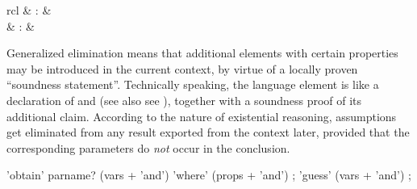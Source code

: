 \begin{isabellebody}
{}
\isamarkuptrue%
%
\begin{isamarkuptext}%
\begin{matharray}{rcl}
    \hypertarget{command.obtain}{\hyperlink{command.obtain}{\mbox{}}} & : &  \\
    \hypertarget{command.guess}{\hyperlink{command.guess}{\mbox{}}}\isa{{\isachardoublequote}\isactrlsup {\isacharasterisk}{\isachardoublequote}} & : &  \\
  \end{matharray}

  Generalized elimination means that additional elements with certain
  properties may be introduced in the current context, by virtue of a
  locally proven ``soundness statement''.  Technically speaking, the
  \hyperlink{command.obtain}{\mbox{}} language element is like a declaration of
  \hyperlink{command.fix}{\mbox{}} and \hyperlink{command.assume}{\mbox{}} (see also see
  ), together with a soundness proof of its
  additional claim.  According to the nature of existential reasoning,
  assumptions get eliminated from any result exported from the context
  later, provided that the corresponding parameters do \emph{not}
  occur in the conclusion.

  \begin{rail}
    'obtain' parname? (vars + 'and') 'where' (props + 'and')
    ;
    'guess' (vars + 'and')
    ;
  \end{rail}


\end{isamarkuptext}
\end{isabellebody}
